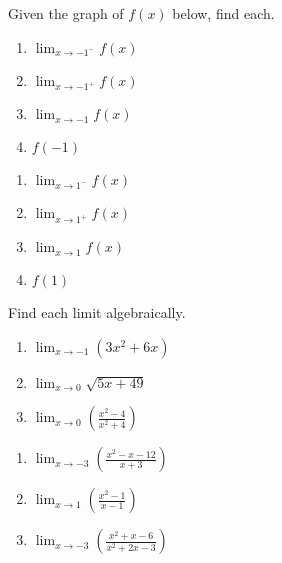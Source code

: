 \documentclass{article}
\newcounter{pset}
\begin{document}
Given the graph of $f(x)$ below, find each.
\begin{center}
\end{center}
\begin{multicols}{4}
\begin{enumerate}   \setcounter{enumi}{\value{pset}}
    \item $\lim_{x \to -1^-} f(x)$
    \item $\lim_{x \to -1^+} f(x)$
    \item $\lim_{x \to -1} f(x)$
    \item $f(-1)$
\end{enumerate} \setcounter{pset}{\value{enumi}}
\end{multicols}
\smallskip 
\begin{multicols}{4}
\begin{enumerate}   \setcounter{enumi}{\value{pset}}
    \item $\lim_{x \to 1^-} f(x)$
    \item $\lim_{x \to 1^+} f(x)$
    \item $\lim_{x \to 1} f(x)$
    \item $f(1)$
\end{enumerate} \setcounter{pset}{\value{enumi}}
\end{multicols}
\bigskip 

Find each limit algebraically.
\begin{multicols}{3}
\begin{enumerate}   \setcounter{enumi}{\value{pset}}
    \item $\lim_{x \to -1}(3x^2 + 6x)$
    \item $\lim_{x \to 0}\sqrt{5x + 49}$
    \item $\lim_{x \to 0}\left(\frac{x^2-4}{x^2+4}\right)$
\end{enumerate}     \setcounter{pset}{\value{enumi}}
\end{multicols}
\smallskip
\begin{multicols}{3}
\begin{enumerate}   \setcounter{enumi}{\value{pset}}
    \item $\lim_{x \to -3}\left(\frac{x^2-x-12}{x+3}\right)$
    \item $\lim_{x \to 1}\left(\frac{x^2-1}{x-1}\right)$
    \item $\lim_{x \to -3}\left(\frac{x^2+x-6}{x^2+2x-3}\right)$
\end{enumerate}     \setcounter{pset}{\value{enumi}}
\end{multicols}
\bigskip
\end{document}
